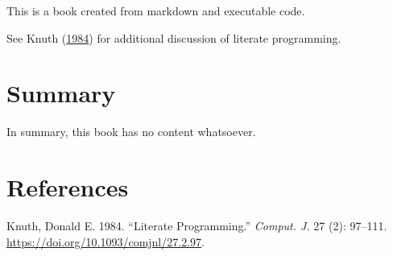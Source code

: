 \documentclass[
  letterpaper,
  DIV=11,
  numbers=noendperiod]{scrreprt}
\newlength{\cslhangindent}
\newlength{\cslentryspacingunit} %
\newenvironment{CSLReferences}[2] %
 {%
  \setlength{\parindent}{0pt}
  \ifodd #1
  \let\oldpar\par
  \def\par{\hangindent=\cslhangindent\oldpar}
  \fi
  \setlength{\parskip}{#2\cslentryspacingunit}
 }%
 {}
\begin{document}
This is a book created from markdown and executable code.

See Knuth (\protect\hyperlink{ref-knuth84}{1984}) for additional
discussion of literate programming.


\hypertarget{summary}{%
\chapter{Summary}\label{summary}}

In summary, this book has no content whatsoever.


\hypertarget{references}{%
\chapter*{References}\label{references}}


\hypertarget{refs}{}
\begin{CSLReferences}{1}{0}
\leavevmode{}%
Knuth, Donald E. 1984. {``Literate Programming.''} \emph{Comput. J.} 27
(2): 97--111. \url{https://doi.org/10.1093/comjnl/27.2.97}.

\end{CSLReferences}
\end{document}
